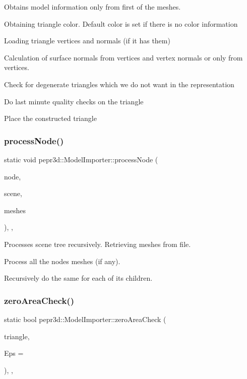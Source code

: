 Obtains model information only from first of the meshes. 

Obtaining triangle color. Default color is set if there is no color information

Loading triangle vertices and normals (if it has them)

Calculation of surface normals from vertices and vertex normals or only from vertices.

Check for degenerate triangles which we do not want in the representation

Do last minute quality checks on the triangle

Place the constructed triangle \mbox{\label{classpepr3d_1_1_model_importer_a4594f67b4aa8b90ac1a21e52e1871494}} 
\subsubsection{\texorpdfstring{processNode()}{processNode()}}
{\footnotesize\ttfamily static void pepr3d\+::\+Model\+Importer\+::process\+Node (\begin{DoxyParamCaption}\item[{ai\+Node $\ast$}]{node,  }\item[{const ai\+Scene $\ast$}]{scene,  }\item[{std\+::vector$<$ ai\+Mesh $\ast$ $>$ \&}]{meshes }\end{DoxyParamCaption})\hspace{0.3cm}{\ttfamily [inline]}, {\ttfamily [static]}, {\ttfamily [private]}}



Processes scene tree recursively. Retrieving meshes from file. 

Process all the node\textquotesingle{}s meshes (if any).

Recursively do the same for each of its children. \mbox{\label{classpepr3d_1_1_model_importer_a4d252ce45c2cf7a093d8b067b55ba2ca}} 
\subsubsection{\texorpdfstring{zeroAreaCheck()}{zeroAreaCheck()}}
{\footnotesize\ttfamily static bool pepr3d\+::\+Model\+Importer\+::zero\+Area\+Check (\begin{DoxyParamCaption}\item[{const std\+::array$<$ glm\+::vec3, 3 $>$ \&}]{triangle,  }\item[{const double}]{Eps = {} }\end{DoxyParamCaption})\hspace{0.3cm}{\ttfamily [inline]}, {\ttfamily [static]}, {\ttfamily [private]}}



